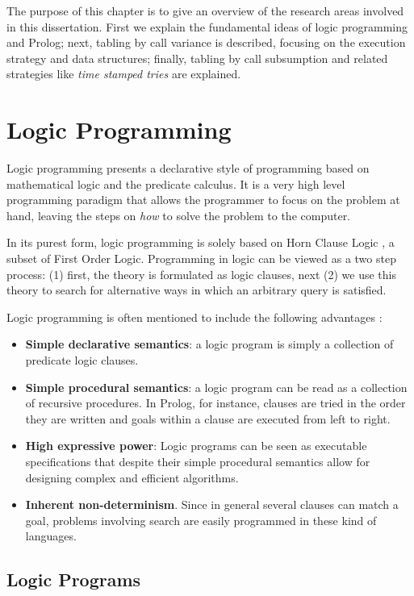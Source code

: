 
The purpose of this chapter is to give an overview of the research areas
involved in this dissertation. First we explain the fundamental ideas of logic
programming and Prolog; next, tabling by call variance is described, focusing on
the execution strategy and data structures; finally, tabling by call subsumption
and related strategies like \textit{time stamped tries} are explained.

\section{Logic Programming}

Logic programming presents a declarative style of programming based on mathematical
logic and the predicate calculus. It is a very high level programming
paradigm that allows the programmer to focus on the problem at hand, leaving the
steps on \textit{how} to solve the problem to the computer.

In its purest form, logic programming is solely based on Horn Clause Logic \cite{Lloyd-87},
a subset of First Order Logic. Programming in logic can be viewed as
a two step process: (1) first, the theory is formulated as logic clauses,
next (2) we use this theory to search for alternative ways in which an arbitrary query is satisfied.

Logic programming is often mentioned to include the following advantages \cite{Carlsson-PhD}:

\begin{itemize}
  \item \textbf{Simple declarative semantics}: a logic program is simply a collection of predicate logic clauses.
  \item \textbf{Simple procedural semantics}: a logic program can be read as a collection of recursive procedures. In Prolog, for instance, clauses are tried in the order they are written and goals within a clause are executed from left to right.
  \item \textbf{High expressive power}: Logic programs can be seen as executable specifications that despite their simple procedural semantics allow for designing complex and efficient algorithms.
  \item \textbf{Inherent non-determinism}. Since in general several clauses can match a goal, problems involving search are easily programmed in these kind of languages.
\end{itemize}

\subsection{Logic Programs}

